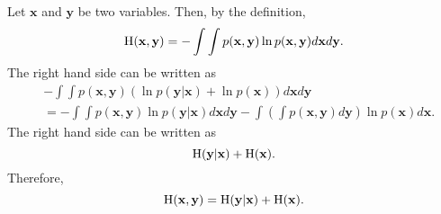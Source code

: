 \subsection{}
Let $\mathbf{x}$ and $\mathbf{y}$ be two variables.
Then, by the definition, 
%
\begin{equation}
{\rm H}(\mathbf{x}, \mathbf{y}) = - \int \int p(\mathbf{x}, \mathbf{y}) \ln p(\mathbf{x}, \mathbf{y}) d\mathbf{x} d\mathbf{y}.
\end{equation}
%
The right hand side can be written as
%
\begin{equation}
\begin{aligned}
&- \int \int p(\mathbf{x}, \mathbf{y}) \left( \ln p(\mathbf{y} | \mathbf{x}) + \ln p(\mathbf{x}) \right) d\mathbf{x} d\mathbf{y} \\
&= - \int \int p(\mathbf{x}, \mathbf{y}) \ln p(\mathbf{y} | \mathbf{x}) d\mathbf{x} d\mathbf{y} - \int \left( \int p(\mathbf{x}, \mathbf{y}) d\mathbf{y} \right) \ln p(\mathbf{x}) d\mathbf{x}.
\end{aligned}
\end{equation}
%
The right hand side can be written as
%
\begin{equation}
{\rm H}(\mathbf{y} | \mathbf{x}) + {\rm H}(\mathbf{x}).
\end{equation}
%
Therefore,
%
\begin{equation}
{\rm H}(\mathbf{x}, \mathbf{y}) = {\rm H}(\mathbf{y} | \mathbf{x}) + {\rm H}(\mathbf{x}).
\end{equation}
%


